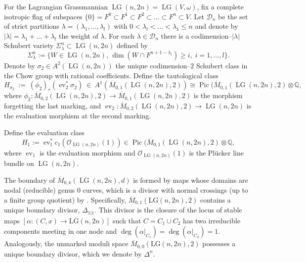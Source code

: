 \documentclass[10pt]{amsart}
\theoremstyle{definition}
\newcommand{\Mbar}{\overline{M}}
\newcommand{\OO}{\mathcal{O}}
\newcommand{\Pic}{\operatorname{Pic}}
\newcommand{\LG}{\operatorname{LG}}
\newcommand{\ev}{\operatorname{ev}}
\newcommand{\QQ}{\mathbb{Q}}
\theoremstyle{plain} %
\begin{document}
For the Lagrangian Grassmannian $\LG(n,2n)=\LG(V,\omega)$, fix a complete isotropic flag of  subspaces
$\{0\}=F^0\subset F^1 \subset F^2 \subset \dots \subset F^n \subset V$.  Let $\mathcal{D}_n$ be the set of strict partitions $\lambda=(\lambda_1, \dots, \lambda_l)$ with $0 < \lambda_l < \dots < \lambda_1 \le n$ and denote by $\left|\lambda \right|= \lambda_1 + \dots + \lambda_l$ the weight of $\lambda$. For each $\lambda \in \mathcal{D}_n$ there is a codimension--$\left|\lambda \right|$ Schubert variety $\Sigma^n_\lambda \subset \LG(n,2n)$ defined by 
$$\Sigma^n_\lambda:=\{W \in \LG(n,2n),\, \dim(W \cap F^{n+1-\lambda_i}) \ge i,\; i=1, \dots,l\}.$$
Denote by $\sigma_2\in A^2(\LG(n,2n))$ the unique codimension--$2$ Schubert class in the Chow group with rational coefficients. Define the tautological class 
\[
H_{\sigma_2}\ :=\ (\phi_{2})_*(\ev_{2}^*\sigma_2)\ \in\ A^1(\overline{M}_{0,1}(\LG(n,2n),2))\cong\Pic (\overline{M}_{0,1}(\LG(n,2n),2)\otimes\QQ,
\]
where $\phi_{2}\colon\overline{M}_{0,2}(\LG(n,2n),2)\to \overline{M}_{0,1}(\LG(n,2n),2)$ is the morphism forgetting the last marking, and \(\ev_2: \Mbar_{0,2}(\LG(n,2n),2) \to \LG(n,2n)\) is the evaluation morphism at the second marking.  %

Define the evaluation class
\begin{equation*}
H_1:=\ev_1^*c_1(\OO_{\LG(n,2n)}(1))\in\Pic (\overline{M}_{0,1}(\LG(n,2n),2)\otimes\QQ,
\end{equation*}
where \(\ev_1\) is the evaluation morphism and \(\OO_{\LG(n,2n)}(1)\) is the Plücker line bundle on $\LG(n,2n)$.


The boundary of $\overline{M}_{0,k}(\LG(n,2n),d)$ is formed by maps whose domains are nodal (reducible) genus $0$ curves, which is a divisor with normal crossings (up to a finite group quotient) by \cite{FP97}. Specifically, $\overline{M}_{0,1}(\mathrm{LG}(n,2n),2)$ contains a unique boundary divisor, $\Delta_{1|1}$. This divisor is the closure of the locus of stable maps $[\alpha\colon(C,x) \to \mathrm{LG}(n,2n)]$ such that
$C=C_1\cup C_2$ has two irreducible components meeting in one node and $\deg(\alpha|_{C_1})=\deg(\alpha|_{C_2})=1$.  Analogously, the unmarked moduli space $\overline{M}_{0,0}(\mathrm{LG}(n,2n),2)$ possesses a unique boundary divisor, which we denote by $\Delta^n$.
\end{document}
